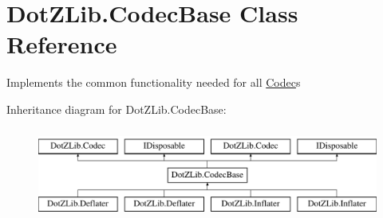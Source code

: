 \hypertarget{class_dot_z_lib_1_1_codec_base}{}\section{Dot\+Z\+Lib.\+Codec\+Base Class Reference}
\label{class_dot_z_lib_1_1_codec_base}


Implements the common functionality needed for all \hyperlink{interface_dot_z_lib_1_1_codec}{Codec}s  


Inheritance diagram for Dot\+Z\+Lib.\+Codec\+Base\+:\begin{figure}[H]
\begin{center}
\leavevmode
\includegraphics[height=3.000000cm]{class_dot_z_lib_1_1_codec_base}
\end{center}
\end{figure}
